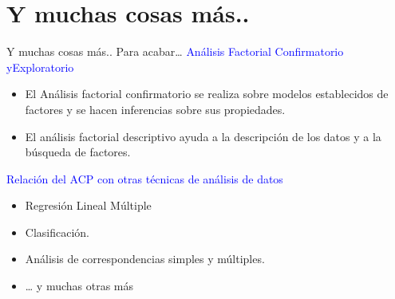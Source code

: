 \documentclass[
  ignorenonframetext,
]{beamer}
\providecommand{\tightlist}{%
  \setlength{\itemsep}{0pt}\setlength{\parskip}{0pt}}
\newcommand\blue[1]{\textcolor{blue}{#1}}
\begin{document}
\section{Y muchas cosas más..}\label{y-muchas-cosas-muxe1s..}

\begin{frame}{Y muchas cosas más..}
\label{y-muchas-cosas-muxe1s..-1}
Para acabar\ldots{}
\blue{Análisis Factorial Confirmatorio yExploratorio}

\begin{itemize}
\item
  El Análisis factorial confirmatorio se realiza sobre modelos
  establecidos de factores y se hacen inferencias sobre sus propiedades.
\item
  El análisis factorial descriptivo ayuda a la descripción de los datos
  y a la búsqueda de factores.
\end{itemize}

\blue{Relación del ACP con otras técnicas de análisis de datos}

\begin{itemize}
\tightlist
\item
  Regresión Lineal Múltiple
\item
  Clasificación.
\item
  Análisis de correspondencias simples y múltiples.
\item
  \ldots{} y muchas otras más
\end{itemize}
\end{frame}
\end{document}
